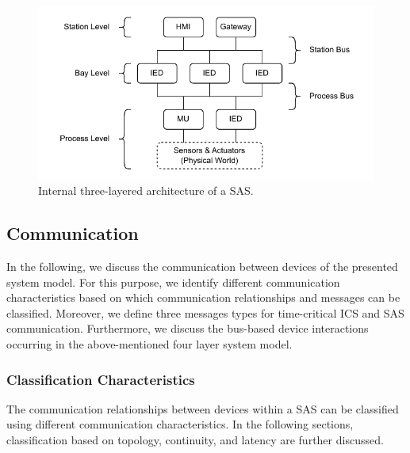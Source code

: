 \begin{figure}
    \centering
    \includegraphics[width=1.0\linewidth]{figures/substation_architecture.drawio.pdf}
    \caption{Internal three-layered architecture of a SAS.}
    \label{fig:substation_architecture}
\end{figure}

\subsection{Communication}
\label{sec:approach:system_model:communication}
In the following, we discuss the communication between devices of the presented system model.
For this purpose, we identify different communication characteristics based on which communication relationships and messages can be classified.
Moreover, we define three messages types for time-critical ICS and SAS communication.
Furthermore, we discuss the bus-based device interactions occurring in the above-mentioned four layer system model.

\subsubsection{Classification Characteristics}
The communication relationships between devices within a SAS can be classified using different communication characteristics.
In the following sections, classification based on topology, continuity, and latency are further discussed.

